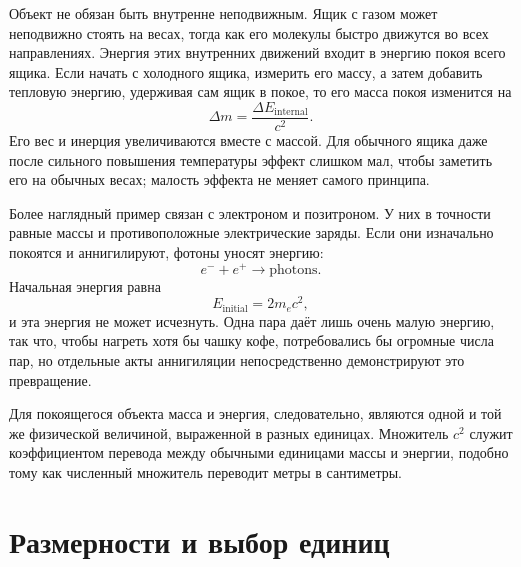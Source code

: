 Объект не обязан быть внутренне неподвижным. Ящик с газом может неподвижно стоять на весах, тогда как его молекулы быстро движутся во всех направлениях. Энергия этих внутренних движений входит в энергию покоя всего ящика. Если начать с холодного ящика, измерить его массу, а затем добавить тепловую энергию, удерживая сам ящик в покое, то его масса покоя изменится на
\begin{equation}
\Delta m=\frac{\Delta E_{\mathrm{internal}}}{c^2}.
\end{equation}
Его вес и инерция увеличиваются вместе с массой. Для обычного ящика даже после сильного повышения температуры эффект слишком мал, чтобы заметить его на обычных весах; малость эффекта не меняет самого принципа.

Более наглядный пример связан с электроном и позитроном. У них в точности равные массы и противоположные электрические заряды. Если они изначально покоятся и аннигилируют, фотоны уносят энергию:
\begin{equation}
e^-+e^+\longrightarrow \text{photons}.
\end{equation}
Начальная энергия равна
\begin{equation}
E_{\mathrm{initial}}=2m_e c^2,
\end{equation}
и эта энергия не может исчезнуть. Одна пара даёт лишь очень малую энергию, так что, чтобы нагреть хотя бы чашку кофе, потребовались бы огромные числа пар, но отдельные акты аннигиляции непосредственно демонстрируют это превращение.

Для покоящегося объекта масса и энергия, следовательно, являются одной и той же физической величиной, выраженной в разных единицах. Множитель \(c^2\) служит коэффициентом перевода между обычными единицами массы и энергии, подобно тому как численный множитель переводит метры в сантиметры.

\begin{classroomqa}
\end{classroomqa}

\section{Размерности и выбор единиц}

